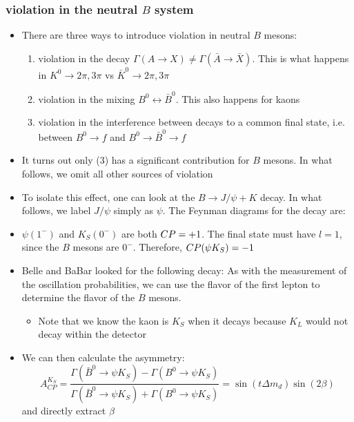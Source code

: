 \subsubsection{\CP violation in the neutral $B$ system}
\begin{itemize}
  \item There are three ways to introduce \CP violation in neutral $B$ mesons:
  \begin{enumerate}
    \item \CP violation in the decay $\Gamma(A\rightarrow X) \neq \Gamma(\bar A \rightarrow \bar X)$. This is what happens in $K^0\rightarrow 2\pi,3\pi$ vs $\bar K^0\rightarrow 2\pi,3\pi$
    \item \CP violation in the mixing $B^0 \leftrightarrow \bar B^0$. This also happens for kaons
    \item \CP violation in the interference between decays to a common final state, i.e. between $B^0\rightarrow f$ and $B^0\rightarrow \bar B^0\rightarrow f$
  \end{enumerate}
  \item It turns out only (3) has a significant contribution for $B$ mesons. In what follows, we omit all other sources of \CP violation
  \item To isolate this effect, one can look at the $B\rightarrow J/\psi + K$ decay. In what follows, we label $J/\psi$ simply as $\psi$. The Feynman diagrams for the decay are:
  \item $\psi (1^-)$ and $K_S(0^-)$ are both $CP=+1$. The final state must have $l=1$, since the $B$ mesons are $0^-$. Therefore, $CP(\psi K_S) = -1$
  \item Belle and BaBar looked for the following decay:
  As with the measurement of the oscillation probabilities, we can use the flavor of the first lepton to determine the flavor of the $B$ mesons. 
  \begin{itemize}
    \item Note that we know the kaon is $K_S$ when it decays because $K_L$ would not decay within the detector
  \end{itemize}
  \item We can then calculate the asymmetry:
  \begin{equation}
    A^{K_S}_{CP} = \frac{\Gamma(\bar B^0 \rightarrow \psi K_S)-\Gamma(B^0 \rightarrow \psi K_S)}{\Gamma(\bar B^0 \rightarrow \psi K_S)+\Gamma(B^0 \rightarrow \psi K_S)} = \sin (t\Delta m_d) \sin(2\beta)
  \end{equation}
  and directly extract $\beta$
\end{itemize}

